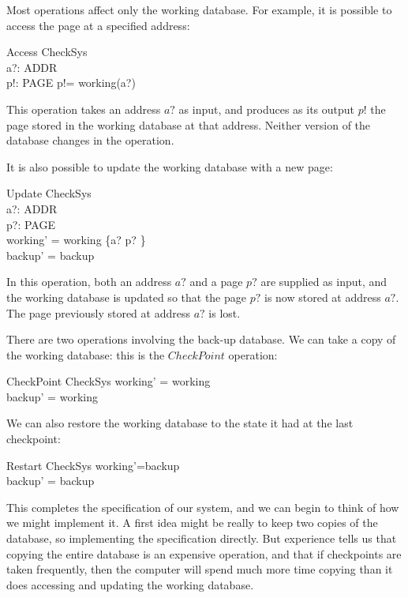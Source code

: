 Most operations affect only the working database. For example,
it is possible to access the page at a specified address:
\begin{schema}{Access}
	\Xi CheckSys \\
	a?: ADDR \\
	p!: PAGE
\where
	p!= working(a?)
\end{schema}
This operation takes an address $a?$ as input, and produces as its output
$p!$ the page stored in the working database at that address.  Neither
version of the database changes in the operation.

It is also possible to update the working database with a new page:
\begin{schema}{Update}
	\Delta CheckSys \\
	a?: ADDR \\
	p?: PAGE \\
\where
	working' = working \oplus \{a? \mapsto p? \} \\
	backup' = backup
\end{schema}
In this operation, both an address $a?$ and a page $p?$ are supplied as
input, and the working database is updated so that the page $p?$ is now
stored at address $a?$.  The page previously stored at address $a?$ is
lost.

There are two operations involving the back-up
database. We can take a copy of the working database: this
is the $CheckPoint$ operation: 
\begin{schema}{CheckPoint}
	\Delta CheckSys
\where
	working' = working \\
	backup' = working
\end{schema}
We can also restore the working database to the state it had
at the last checkpoint:
\begin{schema}{Restart}
	\Delta CheckSys
\where 
	working'=backup \\
	backup' = backup
\end{schema}
This completes the specification of our system, and we can begin to
think of how we might implement it.
A first idea might be really to keep two copies of the database, so
implementing the specification directly.
But experience tells us that copying the entire database is an expensive
operation, and that if checkpoints are taken frequently, then the computer
will spend much more time copying than it does accessing and updating
the working database.

